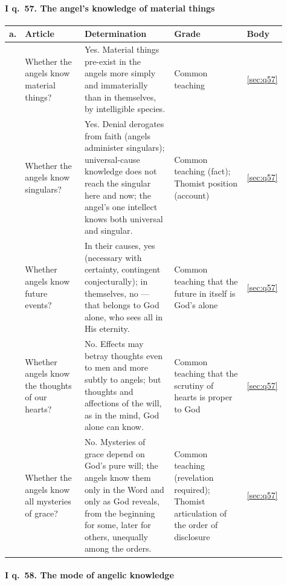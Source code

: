 \paragraph{I q.~57. The angel's knowledge of material things}

\begingroup\footnotesize
\begin{longtable}{>{\raggedright\arraybackslash}p{0.03\linewidth}>{\raggedright\arraybackslash}p{0.22\linewidth}>{\raggedright\arraybackslash}p{0.33\linewidth}>{\raggedright\arraybackslash}p{0.27\linewidth}>{\raggedright\arraybackslash}p{0.06\linewidth}}
\toprule
\textbf{a.} & \textbf{Article} & \textbf{Determination} & \textbf{Grade} & \textbf{Body}\\
\midrule
\endhead
1 & Whether the angels know material things? & Yes. Material things pre-exist in the angels more simply and immaterially than in themselves, by intelligible species. & Common teaching & \ref{sec:q57}\\
2 & Whether the angels know singulars? & Yes. Denial derogates from faith (angels administer singulars); universal-cause knowledge does not reach the singular here and now; the angel's one intellect knows both universal and singular. & Common teaching (fact); Thomist position (account) & \ref{sec:q57}\\
3 & Whether angels know future events? & In their causes, yes (necessary with certainty, contingent conjecturally); in themselves, no --- that belongs to God alone, who sees all in His eternity. & Common teaching that the future in itself is God's alone & \ref{sec:q57}\\
4 & Whether angels know the thoughts of our hearts? & No. Effects may betray thoughts even to men and more subtly to angels; but thoughts and affections of the will, as in the mind, God alone can know. & Common teaching that the scrutiny of hearts is proper to God & \ref{sec:q57}\\
5 & Whether the angels know all mysteries of grace? & No. Mysteries of grace depend on God's pure will; the angels know them only in the Word and only as God reveals, from the beginning for some, later for others, unequally among the orders. & Common teaching (revelation required); Thomist articulation of the order of disclosure & \ref{sec:q57}\\
\bottomrule
\end{longtable}
\endgroup

\paragraph{I q.~58. The mode of angelic knowledge}

